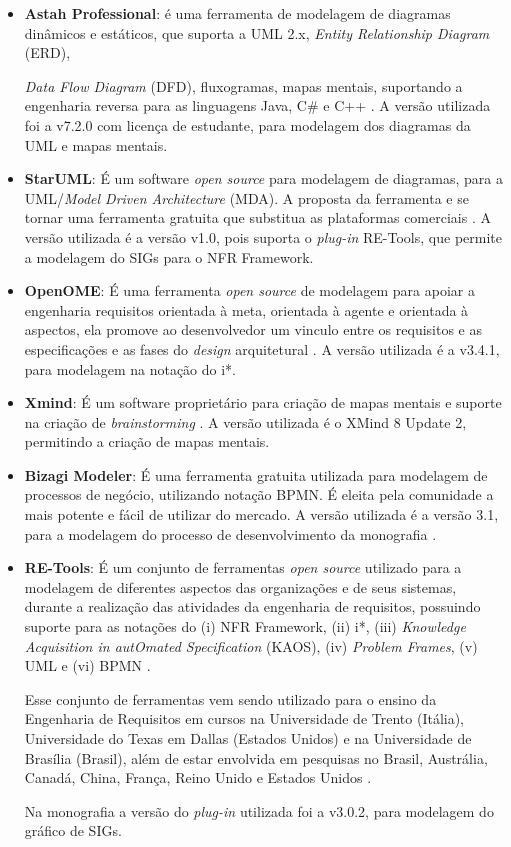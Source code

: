 \begin{itemize}
	\item \textbf{Astah Professional}: é uma ferramenta de modelagem de diagramas dinâmicos e estáticos, que suporta a UML 2.x, \textit{Entity Relationship Diagram} (ERD), 
	
	\textit{Data Flow Diagram} (DFD), fluxogramas, mapas mentais, suportando a engenharia reversa para as linguagens Java, C\# e C++ \cite{astah}. A versão utilizada foi a v7.2.0 com licença de estudante, para modelagem dos diagramas da UML e mapas mentais.   
	
	\item \textbf{StarUML}: É um software \textit{open source} para modelagem de diagramas, para a UML/\textit{Model Driven Architecture} (MDA). A proposta da ferramenta e se tornar uma ferramenta gratuita que substitua as plataformas comerciais \cite{starUML}. A versão utilizada é a versão v1.0, pois suporta o \textit{plug-in} RE-Tools, que permite a modelagem do SIGs para o NFR Framework. 
	
	\item \textbf{OpenOME}: É uma ferramenta \textit{open source} de modelagem para apoiar a engenharia requisitos orientada à meta, orientada à agente e orientada à aspectos, ela promove ao desenvolvedor um vinculo entre os requisitos e as especificações e as fases do \textit{design} arquitetural \cite{openOME}. A versão utilizada é a v3.4.1, para modelagem na notação do i*. 
	
	\item \textbf{Xmind}: É um software proprietário para criação de mapas mentais e suporte na criação de \textit{brainstorming} \cite{xMind}. A versão utilizada é o XMind 8 Update 2, permitindo a criação de mapas mentais. 
	
	\item \textbf{Bizagi Modeler}: É uma ferramenta gratuita utilizada para modelagem de processos de negócio, utilizando notação BPMN. É eleita pela comunidade a mais potente e fácil de utilizar do mercado. A versão utilizada é a versão 3.1, para a modelagem do processo de desenvolvimento da monografia \cite{bizagi}. 
	
	\item \textbf{RE-Tools}: É um conjunto de ferramentas \textit{open source} utilizado para a modelagem de diferentes aspectos das organizações e de seus sistemas, durante a realização das atividades da engenharia de requisitos, possuindo suporte para as notações do (i) NFR Framework, (ii) i*, (iii) \textit{Knowledge Acquisition in autOmated Specification} (KAOS), (iv) \textit{Problem Frames}, (v) UML e (vi) BPMN \cite{reTools} \cite{supakkul2012re}.
	
	Esse conjunto de ferramentas vem sendo utilizado para o ensino da Engenharia de Requisitos em cursos na Universidade de Trento (Itália), Universidade do Texas em Dallas (Estados Unidos) e na Universidade de Brasília (Brasil), além de estar envolvida em pesquisas no Brasil, Austrália, Canadá, China, França, Reino Unido e Estados Unidos \cite{supakkul2012re}. 
	
	Na monografia a versão do \textit{plug-in} utilizada foi a v3.0.2, para modelagem do gráfico de SIGs. 
\end{itemize}

